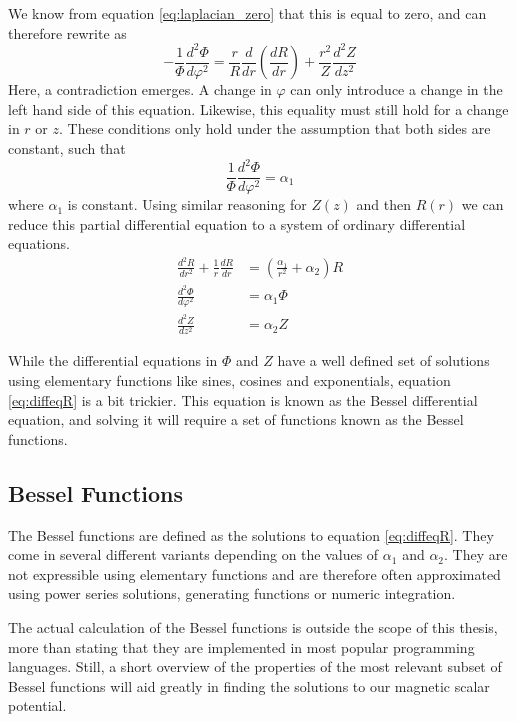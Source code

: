 We know from equation \ref{eq:laplacian_zero} that this is equal to zero,
and can therefore rewrite as
\begin{equation}
    -\frac{1}{\varPhi} \frac{d^2 \varPhi}{d\varphi^2} =
    \frac{r}{R} \frac{d}{dr} \left(\frac{dR}{dr} \right)
    + \frac{r^2}{Z} \frac{d^2 Z}{dz^2}
\end{equation}
Here, a contradiction emerges. A change in $\varphi$ can only
introduce a change in the left hand side of this equation. Likewise,
this equality must still hold for a change in $r$ or $z$. These
conditions only hold under the assumption that both sides are constant,
such that
\begin{equation}
    \frac{1}{\varPhi} \frac{d^2 \varPhi}{d\varphi^2} = \alpha_1
\end{equation}
where $\alpha_1$ is constant. Using similar reasoning for $Z(z)$
and then $R(r)$ we can reduce this partial differential equation to
a system of ordinary differential equations.
\begin{align}
    \frac{d^2R}{dr^2} + \frac{1}{r} \frac{dR}{dr} & =
    \left( \frac{\alpha_1}{r^2} + \alpha_2 \right)R
    \label{eq:diffeqR}                                                \\
    \frac{d^2 \varPhi}{d\varphi^2}                & = \alpha_1\varPhi
    \label{eq:diffeqPhi}                                              \\
    \frac{d^2 Z}{dz^2}                            & = \alpha_2 Z
    \label{eq:diffeqZ}
\end{align}

While the differential equations in $\varPhi$ and $Z$ have a well defined
set of solutions using elementary functions like sines, cosines and exponentials,
equation \ref*{eq:diffeqR} is a bit trickier. This equation is known as
the Bessel differential equation, and solving it will require a
set of functions known as the Bessel functions.

\subsection{Bessel Functions}
The Bessel functions are defined as the solutions to equation \ref*{eq:diffeqR}.
They come in several different variants depending on the values of $\alpha_1$ and
$\alpha_2$. They are not expressible using elementary functions and are therefore
often approximated using power series solutions, generating functions
or numeric integration.

The actual calculation of the Bessel functions is outside the scope of this thesis,
more than stating that they are implemented in most popular programming languages.
Still, a short overview of the properties of the most relevant subset of Bessel
functions will aid greatly in finding the solutions to our magnetic scalar potential.
\cite{weisstein_bessel}
